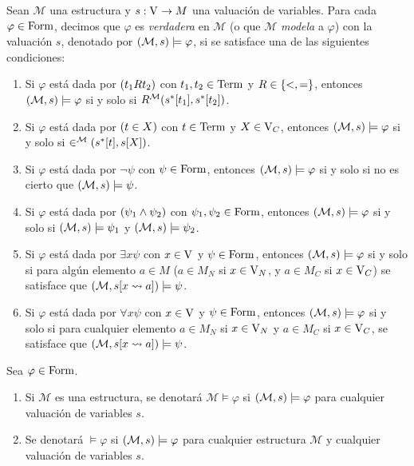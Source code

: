 \begin{definition}
	Sean $\mathcal{M}$ una estructura y $s:\VARIABLES\to M$ una valuación de variables. Para cada $\varphi\in\FORMULAS$, decimos que $\varphi$ es \emph{verdadera} en $\mathcal{M}$ (o que $\mathcal{M}$ \emph{modela} a $\varphi$) con la valuación $s$, denotado por $\pa*{\mathcal{M}, s}\models\varphi$, si se satisface una de las siguientes condiciones:

	\begin{enumerate}
		\item Si $\varphi$ está dada por $\pa*{t_{1} R t_{2}}$ con $t_{1}, t_{2}\in\TERMINOS$ y $R\in\set*{<, =}$, entonces $\pa*{\mathcal{M}, s}\models\varphi$ si y solo si $R^{\mathcal{M}}\pa*{s^{*}\bra*{t_{1}}, s^{*}\bra*{t_{2}}}$.
		\item Si $\varphi$ está dada por $\pa*{t\in X}$ con $t\in\TERMINOS$ y $X\in\VARIABLES[C]$, entonces $\pa*{\mathcal{M}, s}\models\varphi$ si y solo si $\in^{\mathcal{M}}\pa*{s^{*}\bra*{t}, s\bra*{X}}$.
		\item Si $\varphi$ está dada por $\neg\psi$ con $\psi\in\FORMULAS$, entonces $\pa*{\mathcal{M}, s}\models\varphi$ si y solo si no es cierto que $\pa*{\mathcal{M}, s}\models\psi$.
		\item Si $\varphi$ está dada por $\pa*{\psi_{1}\land\psi_{2}}$ con $\psi_{1},\psi_{2}\in\FORMULAS$, entonces $\pa*{\mathcal{M}, s}\models\varphi$ si y solo si $\pa*{\mathcal{M}, s}\models\psi_{1}$ y $\pa*{\mathcal{M}, s}\models\psi_{2}$.
		\item Si $\varphi$ está dada por $\exists x\psi$ con $x\in\VARIABLES$ y $\psi\in\FORMULAS$, entonces $\pa*{\mathcal{M}, s}\models\varphi$ si y solo si para algún elemento $a\in M$ ($a\in M_{N}$ si $x\in\VARIABLES[N]$, y $a\in M_{C}$ si $x\in\VARIABLES[C]$) se satisface que $\pa*{\mathcal{M}, s\bra*{x\leadsto a}}\models\psi$.
		\item Si $\varphi$ está dada por $\forall x\psi$ con $x\in\VARIABLES$ y $\psi\in\FORMULAS$, entonces $\pa*{\mathcal{M}, s}\models\varphi$ si y solo si para cualquier elemento $a\in M_{N}$ si $x\in\VARIABLES[N]$ y $a\in M_{C}$ si $x\in\VARIABLES[C]$, se satisface que $\pa*{\mathcal{M}, s\bra*{x\leadsto a}}\models\psi$.
	\end{enumerate}
\end{definition}

\begin{notation}
	Sea $\varphi\in\FORMULAS$.

	\begin{enumerate}
		\item Si $\mathcal{M}$ es una estructura, se denotará $\mathcal{M}\models\varphi$ si $\pa*{\mathcal{M}, s}\models\varphi$ para cualquier valuación de variables $s$.
		\item Se denotará $\models\varphi$ si $\pa*{\mathcal{M}, s}\models\varphi$ para cualquier estructura $\mathcal{M}$ y cualquier valuación de variables $s$.
	\end{enumerate}
\end{notation}

